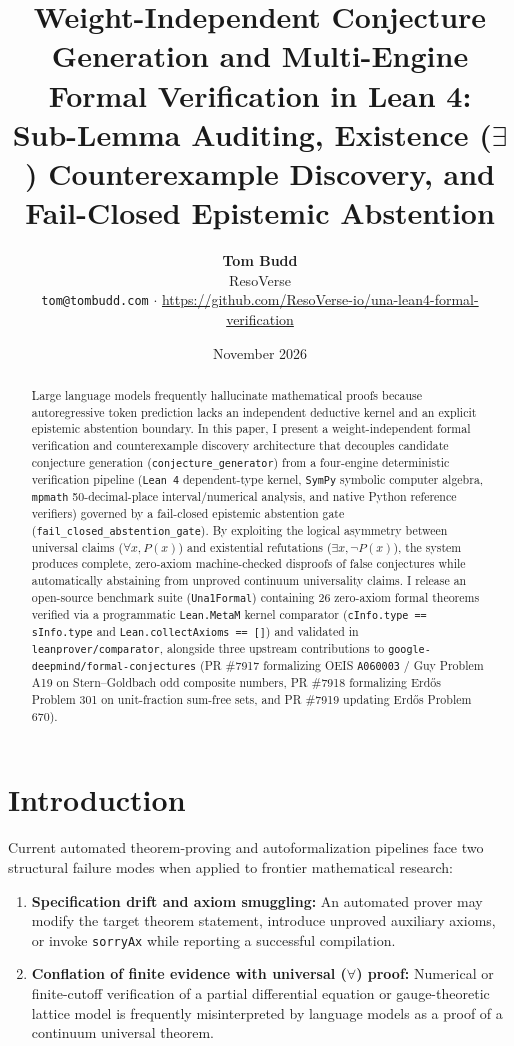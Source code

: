 \documentclass[11pt,a4paper]{article}
\title{\textbf{Weight-Independent Conjecture Generation and Multi-Engine Formal Verification in Lean 4:}\\
\large Sub-Lemma Auditing, Existence ($\exists$) Counterexample Discovery, and Fail-Closed Epistemic Abstention}
\author{
  \textbf{Tom Budd}\\
  ResoVerse\\
  \texttt{tom@tombudd.com} $\cdot$ \url{https://github.com/ResoVerse-io/una-lean4-formal-verification}
}
\date{November 2026}
\begin{document}
\maketitle

\begin{abstract}
Large language models frequently hallucinate mathematical proofs because autoregressive token prediction lacks an independent deductive kernel and an explicit epistemic abstention boundary. In this paper, I present a weight-independent formal verification and counterexample discovery architecture that decouples candidate conjecture generation (\texttt{conjecture\_generator}) from a four-engine deterministic verification pipeline (\texttt{Lean 4} dependent-type kernel, \texttt{SymPy} symbolic computer algebra, \texttt{mpmath} 50-decimal-place interval/numerical analysis, and native Python reference verifiers) governed by a fail-closed epistemic abstention gate (\texttt{fail\_closed\_abstention\_gate}). By exploiting the logical asymmetry between universal claims ($\forall x, P(x)$) and existential refutations ($\exists x, \neg P(x)$), the system produces complete, zero-axiom machine-checked disproofs of false conjectures while automatically abstaining from unproved continuum universality claims. I release an open-source benchmark suite (\texttt{Una1Formal}) containing 26 zero-axiom formal theorems verified via a programmatic \texttt{Lean.MetaM} kernel comparator (\texttt{cInfo.type == sInfo.type} and \texttt{Lean.collectAxioms == []}) and validated in \texttt{leanprover/comparator}, alongside three upstream contributions to \texttt{google-deepmind/formal-conjectures} (PR \#7917 formalizing OEIS \texttt{A060003} / Guy Problem A19 on Stern--Goldbach odd composite numbers, PR \#7918 formalizing Erd\H{o}s Problem 301 on unit-fraction sum-free sets, and PR \#7919 updating Erd\H{o}s Problem 670).
\end{abstract}

\section{Introduction}

Current automated theorem-proving and autoformalization pipelines face two structural failure modes when applied to frontier mathematical research:
\begin{enumerate}
    \item \textbf{Specification drift and axiom smuggling:} An automated prover may modify the target theorem statement, introduce unproved auxiliary axioms, or invoke \texttt{sorryAx} while reporting a successful compilation.
    \item \textbf{Conflation of finite evidence with universal ($\forall$) proof:} Numerical or finite-cutoff verification of a partial differential equation or gauge-theoretic lattice model is frequently misinterpreted by language models as a proof of a continuum universal theorem.
\end{enumerate}
\end{document}

